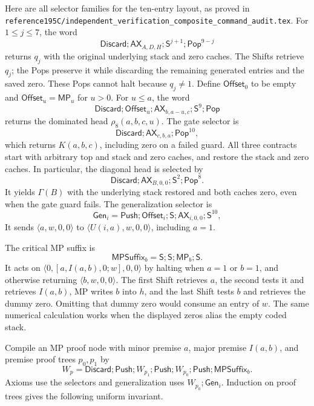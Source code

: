 \documentclass[11pt]{article}
\newcommand{\AX}{\mathsf{AX}}
\newcommand{\MP}{\mathsf{MP}}
\newcommand{\Shift}{\mathsf{S}}
\newcommand{\file}[1]{{\small\nolinkurl{#1}}}
\begin{document}
Here are all selector families for the ten-entry layout, as proved in
\file{reference195C/independent_verification_composite_command_audit.tex}.
For $1\le j\le7$, the word
\[
\mathsf{Discard};\AX_{A,D,H};\Shift^{j+1};\mathsf{Pop}^{9-j}
\]
returns $q_j$ with the original underlying stack and zero caches. The
Shifts retrieve $q_j$; the Pops preserve it while discarding the remaining
generated entries and the saved zero. These Pops cannot halt because
$q_j\ne1$. Define $\mathsf{Offset}_0$ to be empty and
$\mathsf{Offset}_u=\MP_u$ for $u>0$. For $u\le a$, the word
\[
\mathsf{Discard};\mathsf{Offset}_u;\AX_{b,a-u,c};
\Shift^9;\mathsf{Pop}
\]
returns the dominated head $\rho_8(a,b,c,u)$. The gate selector is
\[
\mathsf{Discard};\AX_{c,b,a};\mathsf{Pop}^{10},
\]
which returns $K(a,b,c)$, including zero on a failed guard. All three
contracts start with arbitrary top and stack and zero caches, and restore
the stack and zero caches. In particular, the diagonal head is selected by
\[
\mathsf{Discard};\AX_{B,0,0};\Shift^2;\mathsf{Pop}^8.
\]
It yields $\Gamma(B)$ with the underlying stack restored and both caches
zero, even when the gate guard fails. The generalization selector is
\[
\mathsf{Gen}_i=
\mathsf{Push};\mathsf{Offset}_i;\Shift;
\AX_{i,0,0};\Shift^{10},
\]
It sends $\langle a,w,0,0\rangle$ to
$\langle U(i,a),w,0,0\rangle$, including $a=1$.

The critical MP suffix is
\[
\mathsf{MPSuffix}_b=\Shift;\Shift;\MP_b;\Shift.
\]
It acts on $\langle0,[a,I(a,b),0;w],0,0\rangle$ by halting when
$a=1$ or $b=1$, and otherwise returning $\langle b,w,0,0\rangle$.
The first Shift retrieves $a$, the second tests it and retrieves $I(a,b)$,
MP writes $b$ into $h$, and the last Shift tests $b$ and retrieves the
dummy zero. Omitting that dummy zero would consume an entry of $w$.
The same numerical calculation works when the displayed zeros alias
the empty coded stack.

Compile an MP proof node with minor premise $a$, major premise $I(a,b)$,
and premise proof trees $p_0,p_1$ by
\[
W_p=\mathsf{Discard};\mathsf{Push};W_{p_1};\mathsf{Push};
W_{p_0};\mathsf{Push};\mathsf{MPSuffix}_b.
\]
Axioms use the selectors and generalization uses $W_{p_0};\mathsf{Gen}_i$.
Induction on proof trees gives the following uniform invariant.
\end{document}
